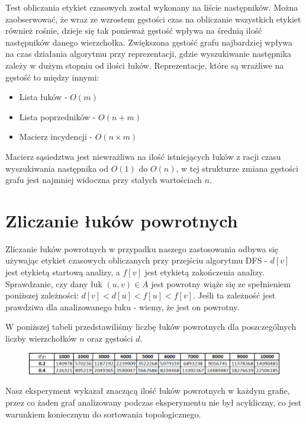 \documentclass{article}
\begin{document}
Test obliczania etykiet czasowych został wykonany na liście następników. Można zaobserwować, że wraz ze wzrostem gęstości czas na obliczanie wszystkich etykiet również rośnie, dzieje się tak ponieważ gęstość wpływa na średnią ilość następników danego wierzchołka. Zwiększona gęstość grafu najbardziej wpływa na czas działania algorytmu przy reprezentacji, gdzie wyszukiwanie następnika zależy w dużym stopniu od ilości łuków. Reprezentacje, które są wrażliwe na gęstość to między innymi:

\begin{itemize}
\item Lista łuków - $O(m)$
\item Lista poprzedników - $O(n+m)$
\item Macierz incydencji - $O(n\times m)$
\end{itemize}

Macierz sąsiedztwa jest niewrażliwa na ilość istniejących łuków z racji czasu wyszukiwania następnika od $O(1)$ do $O(n)$, w tej strukturze zmiana gęstości grafu jest najmniej widoczna przy stałych wartościach $n$.

\section{Zliczanie łuków powrotnych}

Zliczanie łuków powrotnych w przypadku naszego zastosowania odbywa się używając etykiet czasowych obliczanych przy przejściu algorytmu DFS - $d[v]$ jest etykietą startową analizy, a $f[v]$ jest etykietą zakończenia analizy. Sprawdzanie, czy dany łuk $(u,v)\in A$ jest powrotny wiąże się ze spełnieniem poniższej zależności: $d[v] < d[u] < f[u] < f[v]$. Jeśli ta zależność jest prawdziwa dla analizowanego łuku - wiemy, że jest on powrotny.

W poniższej tabeli przedstawiliśmy liczbę łuków powrotnych dla poszczególnych liczby wierzchołków $n$ oraz gęstości $d$.

\begin{figure}[h]
\centering
  \includegraphics[width=1.0\linewidth]{luki_tabela.png}
  \label{fig:luki_tabela}
\end{figure}%

Nasz eksperyment wykazał znaczącą ilość łuków powrotnych w każdym grafie, przez co żaden graf analizowany podczas eksperymentu nie był acykliczny, co jest warunkiem koniecznym do sortowania topologicznego.
\end{document}
